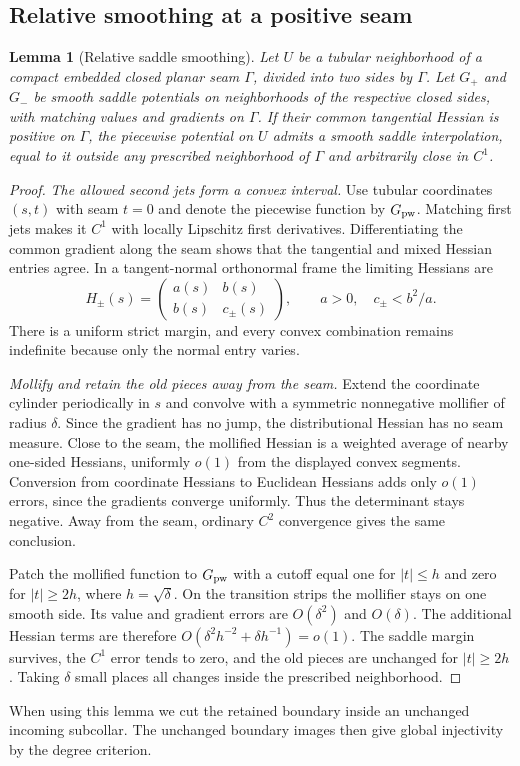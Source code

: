 \documentclass[11pt]{amsart}
\newtheorem{lemma}[theorem]{Lemma}
\theoremstyle{definition}
\theoremstyle{remark}
\numberwithin{equation}{section}
\begin{document}
\subsection{Relative smoothing at a positive seam}
\begin{lemma}[Relative saddle smoothing]\label{lem:smoothing}
Let $U$ be a tubular neighborhood of a compact embedded closed planar
seam $\Gamma$, divided into two sides by $\Gamma$. Let $G_+$ and $G_-$
be smooth saddle potentials on neighborhoods of the respective closed
sides, with matching values and gradients on $\Gamma$. If their common
tangential Hessian is positive on $\Gamma$, the piecewise potential on
$U$ admits a smooth saddle interpolation, equal to it outside any
prescribed neighborhood of $\Gamma$ and arbitrarily close in $C^1$.
\end{lemma}
\begin{proof}
\emph{The allowed second jets form a convex interval.}
Use tubular coordinates $(s,t)$ with seam $t=0$ and denote the piecewise
function by $G_{\rm pw}$. Matching first jets makes it $C^1$ with locally
Lipschitz first derivatives. Differentiating the common gradient along
the seam shows that the tangential and mixed Hessian entries agree.
In a tangent-normal orthonormal frame the limiting Hessians are
\[
 H_\pm(s)=\begin{pmatrix}a(s)&b(s)\\b(s)&c_\pm(s)\end{pmatrix},
 \qquad a>0,\quad c_\pm<b^2/a.
\]
There is a uniform strict margin, and every convex combination remains
indefinite because only the normal entry varies.

\emph{Mollify and retain the old pieces away from the seam.}
Extend the coordinate cylinder periodically in $s$ and convolve with a
symmetric nonnegative mollifier of radius $\delta$. Since the gradient
has no jump, the distributional Hessian has no seam measure. Close to
the seam, the mollified Hessian is a weighted average of nearby one-sided
Hessians, uniformly $o(1)$ from the displayed convex segments. Conversion
from coordinate Hessians to Euclidean Hessians adds only $o(1)$ errors,
since the gradients converge uniformly. Thus the determinant stays negative.
Away from the seam, ordinary $C^2$ convergence gives the same conclusion.

Patch the mollified function to $G_{\rm pw}$ with a cutoff equal one for
$|t|\le h$ and zero for $|t|\ge2h$, where $h=\sqrt\delta$.
On the transition strips the mollifier stays on one smooth side.
Its value and gradient errors are $O(\delta^2)$ and $O(\delta)$.
The additional Hessian terms are therefore
$O(\delta^2h^{-2}+\delta h^{-1})=o(1)$. The saddle margin survives,
the $C^1$ error tends to zero, and the old pieces are unchanged for
$|t|\ge2h$. Taking $\delta$ small places all changes inside the prescribed
neighborhood.
\end{proof}
When using this lemma we cut the retained boundary inside an unchanged
incoming subcollar. The unchanged boundary images then give global
injectivity by the degree criterion.
\end{document}
